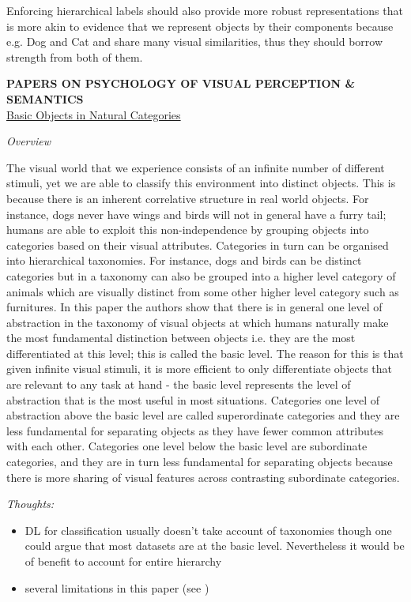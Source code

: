 \documentclass{report}
\begin{document}
Enforcing hierarchical labels should also provide more robust representations that is more akin to evidence that we represent objects by their components \cite{Biederman1989} because e.g. Dog and Cat and share many visual similarities, thus they should borrow strength from both of them. 



\newpage

\textbf{PAPERS ON PSYCHOLOGY OF VISUAL PERCEPTION \& SEMANTICS} \\ 

\underline{Basic Objects in Natural Categories \cite{Rosch1976}}

\textit{Overview}

The visual world that we experience consists of an infinite number of different stimuli, yet we are able to classify this environment into distinct objects. This is because there is an inherent correlative structure in real world objects. For instance, dogs never have wings and birds will not in general have a furry tail; humans are able to exploit this non-independence by grouping objects into categories based on their visual attributes. Categories in turn can be organised into hierarchical taxonomies. For instance, dogs and birds can be distinct categories but in a taxonomy can also be grouped into a higher level category of animals which are visually distinct from some other higher level category such as furnitures. In this paper the authors show that there is in general one level of abstraction in the taxonomy of visual objects at which humans naturally make the most fundamental distinction between objects i.e. they are the most differentiated at this level; this is called the basic level. The reason for this is that given infinite visual stimuli, it is more efficient to only differentiate objects that are relevant to any task at hand - the basic level represents the level of abstraction that is the most useful in most situations. Categories one level of abstraction above the basic level are called superordinate categories and they are less fundamental for separating objects as they have fewer common attributes with each other. Categories one level below the basic level are subordinate categories, and they are in turn less fundamental for separating objects because there is more sharing of visual features across contrasting subordinate categories.

\textit{Thoughts:}
\begin{itemize}
  \item DL for classification usually doesn't take account of taxonomies though one could argue that most datasets are at the basic level. Nevertheless it would be of benefit to account for entire hierarchy 
  \item several limitations in this paper (see \cite{Joliceur1984}) \\
\end{itemize}
\end{document}
